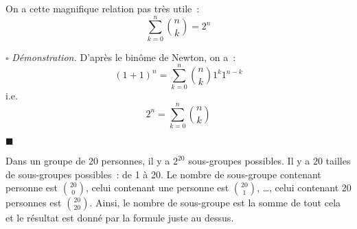 \documentclass[a4paper, titlepage]{article}
\renewenvironment{proof}{$\square$ \footnotesize\textit{Démonstration.}}{\begin{flushright}$\blacksquare$\end{flushright}}
\begin{document}
	\begin{corol}
		On a cette magnifique relation pas très utile~:
		$$ \sum^n_{k=0}\binom nk = 2^n $$	
	\end{corol}
	\begin{proof}
		D'après le binôme de Newton, on a~:
		$$ (1+1)^n = \sum_{k=0}^{n} \binom nk 1^k1^{n-k} $$
		i.e.
		$$ 2^n = \sum_{k=0}^{n} \binom nk $$
	\end{proof}
	\begin{exemple}
	Dans un groupe de 20 personnes, il y a $2^{20}$ sous-groupes possibles. Il y a $20$ tailles de sous-groupes possibles~: de 1 à 20. Le nombre de sous-groupe contenant personne est $\binom{20}0$, celui contenant une personne est $\binom{20}1$, \ldots, celui contenant 20 personnes est $\binom{20}{20}$. Ainsi, le nombre de sous-groupe est la somme de tout cela et le résultat est donné par la formule juste au dessus.
	\end{exemple}
\end{document}
